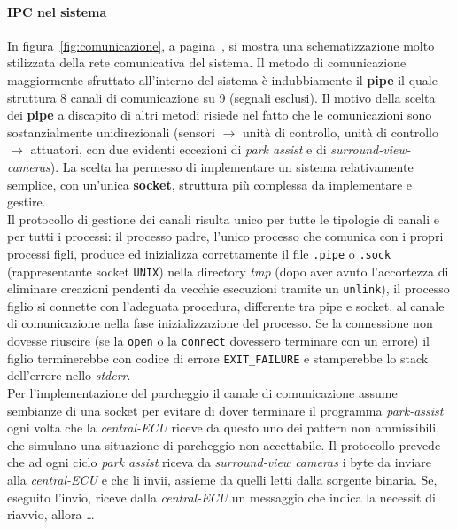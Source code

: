 \documentclass[11pt, openany]{article}
\theoremstyle{definition}
\theoremstyle{plain}
\theoremstyle{remark}
\begin{document}
		\paragraph{IPC nel sistema}
			In figura~\ref{fig:comunicazione}, a pagina~\pageref{fig:comunicazione}, si mostra una schematizzazione molto stilizzata della rete comunicativa del sistema.
			Il metodo di comunicazione maggiormente sfruttato all'interno del sistema è indubbiamente il \textbf{pipe} il quale struttura 8 canali di comunicazione su 9 (segnali esclusi). Il motivo della scelta dei \textbf{pipe} a discapito di altri metodi risiede nel fatto che le comunicazioni sono sostanzialmente unidirezionali (sensori $\rightarrow$ unità di controllo, unità di controllo $\rightarrow$ attuatori, con due evidenti eccezioni di \textit{park assist} e di \textit{surround-view-cameras}). La scelta ha permesso di implementare un sistema relativamente semplice, con un'unica \textbf{socket}, struttura più complessa da implementare e gestire.\\
			Il protocollo di gestione dei canali risulta unico per tutte le tipologie di canali e per tutti i processi: il processo padre, l'unico processo che comunica con i propri processi figli, produce ed inizializza correttamente il file \texttt{.pipe} o \texttt{.sock} (rappresentante socket \texttt{UNIX}) nella directory \textit{tmp} (dopo aver avuto l'accortezza di eliminare creazioni pendenti da vecchie esecuzioni tramite un \texttt{unlink}), il processo figlio si connette con  l'adeguata procedura, differente tra pipe e socket, al canale di comunicazione nella fase inizializzazione del processo. Se la connessione non dovesse riuscire (se la \texttt{open} o la \texttt{connect} dovessero terminare con un errore) il figlio terminerebbe con codice di errore \texttt{EXIT\_FAILURE} e stamperebbe lo stack dell'errore nello \textit{stderr}.\\
			Per l'implementazione del parcheggio il canale di comunicazione assume sembianze di una socket per evitare di dover terminare il programma \textit{park-assist} ogni volta che la \textit{central-ECU} riceve da questo uno dei pattern non ammissibili, che simulano una situazione di parcheggio non accettabile. Il protocollo prevede che ad ogni ciclo \textit{park assist} riceva da \textit{surround-view cameras} i byte da inviare alla \textit{central-ECU} e che li invii, assieme da quelli letti dalla sorgente binaria. Se, eseguito l'invio, riceve dalla \textit{central-ECU} un messaggio che indica la necessit di riavvio, allora \dots
\end{document}
